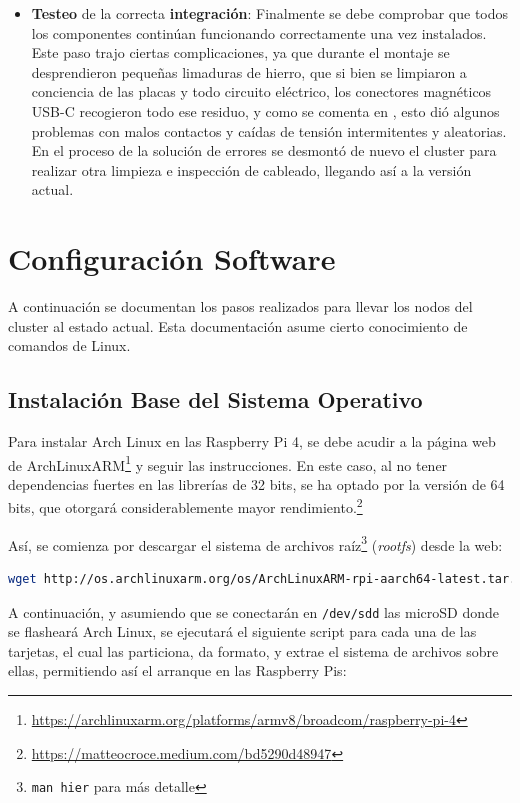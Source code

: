 \begin{itemize}
    \item \textbf{Testeo} de la correcta \textbf{integración}: Finalmente se debe comprobar que todos los componentes continúan funcionando correctamente una vez instalados. Este paso trajo ciertas complicaciones, ya que durante el montaje se desprendieron pequeñas limaduras de hierro, que si bien se limpiaron a conciencia de las placas y todo circuito eléctrico, los conectores magnéticos USB-C recogieron todo ese residuo, y como se comenta en , esto dió algunos problemas con malos contactos y caídas de tensión intermitentes y aleatorias. En el proceso de la solución de errores se desmontó de nuevo el cluster para realizar otra limpieza e inspección de cableado, llegando así a la versión actual.
\end{itemize}

\section{Configuración Software}
\label{sec:configuracion_software}
A continuación se documentan los pasos realizados para llevar los nodos del cluster al estado actual. Esta documentación asume cierto conocimiento de comandos de Linux.

\subsection{Instalación Base del Sistema Operativo}
\label{ssec:instalacion_sistema_operativo}
Para instalar Arch Linux en las Raspberry Pi 4, se debe acudir a la página web de ArchLinuxARM\footnote{\url{https://archlinuxarm.org/platforms/armv8/broadcom/raspberry-pi-4}} y seguir las instrucciones. En este caso, al no tener dependencias fuertes en las librerías de 32 bits, se ha optado por la versión de 64 bits, que otorgará considerablemente mayor rendimiento.\footnote{\url{https://matteocroce.medium.com/bd5290d48947}}

Así, se comienza por descargar el sistema de archivos raíz\footnote{\texttt{man hier} para más detalle} (\textit{\gls{rootfs}}) desde la web:

\begin{lstlisting}[language=bash,basicstyle=\scriptsize]
wget http://os.archlinuxarm.org/os/ArchLinuxARM-rpi-aarch64-latest.tar.gz
\end{lstlisting}

A continuación, y asumiendo que se conectarán en \texttt{/dev/sdd} las microSD donde se flasheará Arch Linux, se ejecutará el siguiente script para cada una de las tarjetas, el cual las particiona, da formato, y extrae el sistema de archivos sobre ellas, permitiendo así el arranque en las Raspberry Pis:

